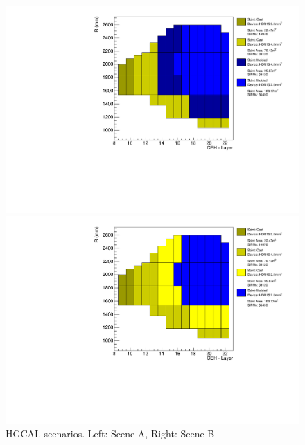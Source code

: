 \begin{figure}[!ht]
\begin{minipage}[c]{0.49\textwidth}
    \includegraphics[trim={0 0 165pt 0},clip,width=\textwidth]{figures/hgcal/plot_scenes/sceneA_jan20_fix_vto2p0_with9mm2.pdf}
  \end{minipage}
  \begin{minipage}[c]{0.49\textwidth}
    \includegraphics[trim={0 0 165pt 0},clip,width=\textwidth]{figures/hgcal/plot_scenes/sceneB_jan20_fix_vto2p0_with9mm2.pdf}
  \end{minipage}
  \caption[\gls{HGCAL} scenarios]{\gls{HGCAL} scenarios. Left: Scene A, Right: Scene B}%
  \label{fig:hgcal-scenes-fnal-jan20}
\end{figure}

